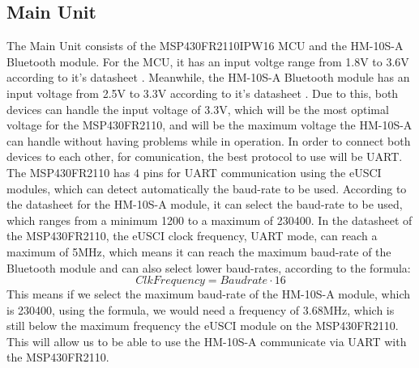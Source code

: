 \subsection{Main Unit}
The Main Unit consists of the MSP430FR2110IPW16 MCU and the HM-10S-A Bluetooth module. For the MCU, it has an input voltge range from 1.8\si{\V} to 3.6\si{\V} according to it's datasheet \cite{MSP430FR2110IPW16R}. Meanwhile, the HM-10S-A Bluetooth module has an input voltage from 2.5\si{\V} to 3.3\si{\V} according to it's datasheet \cite{HM10BluetoothModule}. Due to this, both devices can handle the input voltage of 3.3\si{\V}, which will be the most optimal voltage for the MSP430FR2110, and will be the maximum voltage the HM-10S-A can handle without having problems while in operation. In order to connect both devices to each other, for comunication, the best protocol to use will be UART. The MSP430FR2110 has 4 pins for UART communication using the eUSCI modules, which can detect automatically the baud-rate to be used. According to the datasheet for the HM-10S-A module\cite{HM10BluetoothModule}, it can select the baud-rate to be used, which ranges from a minimum 1200 to a maximum of 230400. In the datasheet of the MSP430FR2110, the eUSCI clock frequency, UART mode, can reach a maximum of 5MHz, which means it can reach the maximum baud-rate of the Bluetooth module and can also select lower baud-rates, according to the formula:
\begin{equation}
	Clk Frequency = Baudrate \cdot 16
	\label{eq:UART Frequency}
\end{equation}
This means if we select the maximum baud-rate of the HM-10S-A module, which is 230400, using the formula, we would need a frequency of 3.68MHz, which is still below the maximum frequency the eUSCI module on the MSP430FR2110. This will allow us to be able to use the HM-10S-A communicate via UART with the MSP430FR2110.

